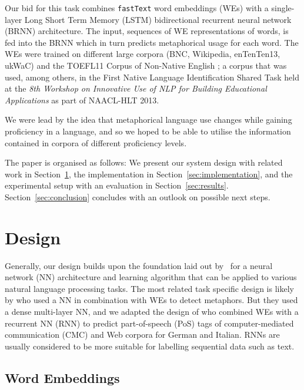 \documentclass[11pt,a4paper]{article}
\newcommand\fT{\texttt{fastText}\xspace}
\begin{document}
Our bid for this task combines \fT \cite{bojanowski2016enriching} word embeddings (WEs) with a single-layer Long Short Term Memory (LSTM) bidirectional recurrent neural network (BRNN) architecture.
The input, sequences of WE representations of words, is fed into the BRNN which in turn predicts metaphorical usage for each word. 
The WEs were trained on different large corpora (BNC, Wikipedia, enTenTen13, ukWaC) and the TOEFL11 Corpus of Non-Native English \cite{ETS2:ETS202331}; a corpus that was used, among others, in the First Native Language Identification Shared Task \cite{tetreault-blanchard-cahill:2013:BEA} held at the \emph{8th Workshop on Innovative Use of NLP for Building Educational Applications} as part of NAACL-HLT 2013.

We were lead by the idea that metaphorical language use changes while gaining proficiency in a language, and so we hoped to be able to utilise the information contained in corpora of different proficiency levels.

The paper is organised as follows: We present our system design with related work in
Section~\ref{sec:design}, the implementation in
Section~\ref{sec:implementation}, and the experimental setup with an evaluation in
Section~\ref{sec:results}. 
Section~\ref{sec:conclusion} concludes with an outlook on possible next steps.



\section{Design} %
\label{sec:design}

Generally, our design builds upon the foundation laid out by~ for a neural network (NN) architecture and learning algorithm that can be applied to various natural language processing tasks.
The most related task specific design is likely by  who used a NN in combination with WEs to detect metaphors. 
But they used a dense multi-layer NN, and we adapted the design of  who combined WEs with a recurrent NN (RNN) to predict part-of-speech (PoS) tags of computer-mediated communication (CMC) and Web corpora for German and Italian.
RNNs are usually considered to be more suitable for labelling sequential data such as text.


\subsection{Word Embeddings} %
\label{subsec:we}
\end{document}
